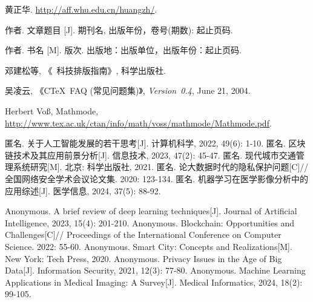 \documentclass[class = professional, oneside, AutoFakeBold=3.17,AutoFakeSlant=0.2]{gdufe_master_thesis}
\begin{document}
\cleardoublepage
{}
\appendix
\begin{thebibliography}{00}
    黄正华. \url{http://aff.whu.edu.cn/huangzh/}.

     作者. 文章题目 [J].  期刊名, 出版年份，卷号(期数): 起止页码.

     作者. 书名 [M]. 版次. 出版地：出版单位，出版年份：起止页码.

     邓建松等, 《\LaTeXe~科技排版指南》, 科学出版社.

     吴凌云, 《CTeX~FAQ (常见问题集)》, \textit{Version~0.4}, June 21, 2004.

     Herbert Vo\ss, Mathmode, \url{http://www.tex.ac.uk/ctan/info/math/voss/mathmode/Mathmode.pdf}.

     匿名. 关于人工智能发展的若干思考[J]. 计算机科学, 2022, 49(6): 1-10.
     匿名. 区块链技术及其应用前景分析[J]. 信息技术, 2023, 47(2): 45-47.
     匿名. 现代城市交通管理系统研究[M]. 北京: 科学出版社, 2021.
     匿名. 论大数据时代的隐私保护问题[C]// 全国网络安全学术会议论文集. 2020: 123-134.
     匿名. 机器学习在医学影像分析中的应用综述[J]. 医学信息, 2024, 37(5): 88-92.

     Anonymous. A brief review of deep learning techniques[J]. Journal of Artificial Intelligence, 2023, 15(4): 201-210.
     Anonymous. Blockchain: Opportunities and Challenges[C]// Proceedings of the International Conference on Computer Science. 2022: 55-60.
     Anonymous. Smart City: Concepts and Realizations[M]. New York: Tech Press, 2020.
     Anonymous. Privacy Issues in the Age of Big Data[J]. Information Security, 2021, 12(3): 77-80.
     Anonymous. Machine Learning Applications in Medical Imaging: A Survey[J]. Medical Informatics, 2024, 18(2): 99-105.
\end{thebibliography}

\printbibliography[heading=bibintoc, title={参考文献--bib}]



\cleardoublepage
\end{document}
